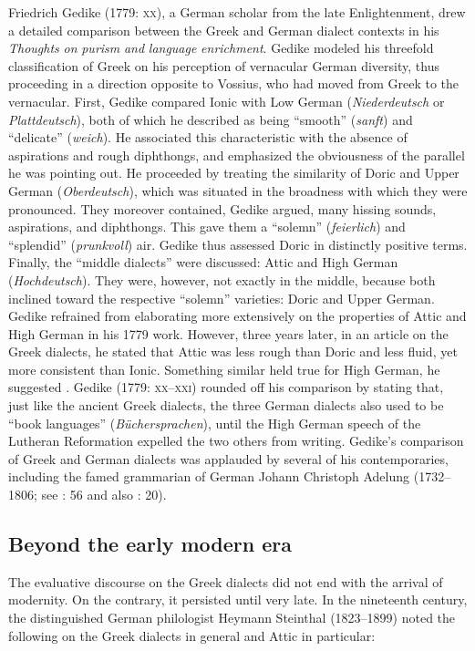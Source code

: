 Friedrich Gedike (1779: \textsc{xx}), a German scholar from the late Enlightenment, drew a detailed comparison between the Greek and German dialect contexts in his \textit{Thoughts} \textit{on} \textit{purism} \textit{and} \textit{language} \textit{enrichment}. Gedike modeled his threefold classification of Greek on his perception of vernacular German diversity, thus proceeding in a direction opposite to Vossius, who had moved from Greek to the vernacular. First, Gedike compared Ionic with Low German (\textit{Niederdeutsch} or \textit{Plattdeutsch}), both of which he described as being “smooth” (\textit{sanft}) and “delicate” (\textit{weich}). He associated this characteristic with the absence of aspirations and rough diphthongs, and emphasized the obviousness of the parallel he was pointing out. He proceeded by treating the similarity of Doric and Upper German (\textit{Oberdeutsch}), which was situated in the broadness with which they were pronounced. They moreover contained, Gedike argued, many hissing sounds, aspirations, and diphthongs. This gave them a “solemn” (\textit{feierlich}) and “splendid” (\textit{prunkvoll}) air. Gedike thus assessed Doric in distinctly positive terms. Finally, the “middle dialects” were discussed: Attic and High German (\textit{Hochdeutsch}). They were, however, not exactly in the middle, because both inclined toward the respective “solemn” varieties: Doric and Upper German. Gedike refrained from elaborating more extensively on the properties of Attic and High German in his 1779 work. However, three years later, in an article on the Greek dialects, he stated that Attic was less rough than Doric and less fluid, yet more consistent than Ionic. Something similar held true for High German, he suggested \citep[25]{Gedike1782}. Gedike (1779: \textsc{xx–xxi)} rounded off his comparison by stating that, just like the ancient Greek dialects, the three German dialects also used to be “book languages” (\textit{Büchersprachen}), until the High German speech of the Lutheran Reformation expelled the two others from writing. Gedike’s comparison of Greek and German dialects was applauded by several of his contemporaries, including the famed grammarian of German Johann Christoph Adelung (1732–1806; see \citealt{Adelung1781}: 56 and also \citealt{Moritz1781}: 20).

\subsection{Beyond the early modern era}
\hypertarget{Toc19704853}{}
The evaluative discourse on the Greek dialects did not end with the arrival of modernity. On the contrary, it persisted until very late. In the nineteenth century, the distinguished German philologist Heymann Steinthal (1823–1899) noted the following on the Greek dialects in general and Attic in particular:


